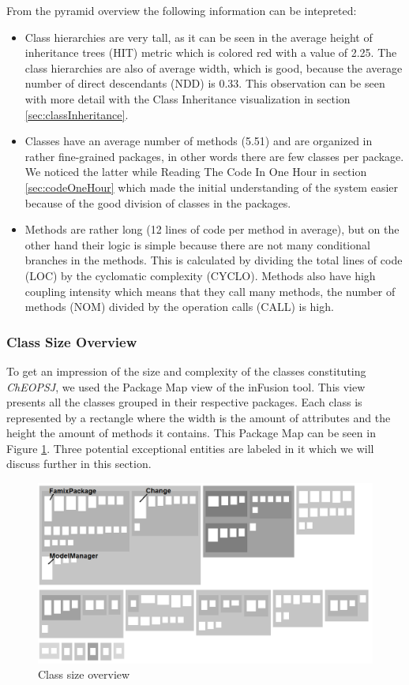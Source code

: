 \documentclass{article}
\begin{document}
From the pyramid overview the following information can be intepreted:
\begin{itemize}
  \item Class hierarchies are very tall, as it can be seen in the average height of inheritance trees (HIT) metric which is colored red with a value of 2.25. The class hierarchies are also of average width, which is good, because the average number of direct descendants (NDD) is 0.33. This observation can be seen with more detail with the Class Inheritance visualization in section \ref{sec:classInheritance}.
  \item Classes have an average number of methods (5.51) and are organized in rather fine-grained packages, in other words there are few classes per package. We noticed the latter while Reading The Code In One Hour in section \ref{sec:codeOneHour} which made the initial understanding of the system easier because of the good division of classes in the packages.
  \item Methods are rather long (12 lines of code per method in average), but on the other hand their logic is simple because there are not many conditional branches in the methods. This is calculated by dividing the total lines of code (LOC) by the cyclomatic complexity (CYCLO). Methods also have high coupling intensity which means that they call many methods, the number of methods (NOM) divided by the operation calls (CALL) is high.
\end{itemize}

\subsubsection{Class Size Overview}
To get an impression of the size and complexity of the classes constituting \emph{ChEOPSJ}, we used the Package Map view of the inFusion tool. This view presents all the classes grouped in their respective packages. Each class is represented by a rectangle where the width is the amount of attributes and the height the amount of methods it contains. This Package Map can be seen in Figure \ref{fig:sizeOverview}. Three potential exceptional entities are labeled in it which we will discuss further in this section.

\begin{figure}[h]
\centering
\includegraphics[width=1\textwidth]{Images/classSizeOverview}
\caption{Class size overview}
\label{fig:sizeOverview}
\end{figure}
\end{document}

